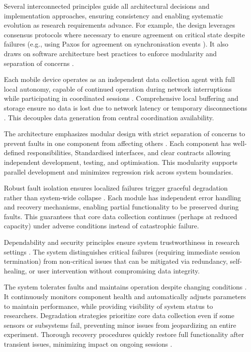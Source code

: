 \documentclass[11pt,a4paper]{report}
\begin{document}
Several interconnected principles guide all architectural decisions and implementation approaches, ensuring consistency and enabling systematic evolution as research requirements advance. For example, the design leverages consensus protocols where necessary to ensure agreement on critical state despite failures (e.g., using Paxos for agreement on synchronisation events \cite{Lamport2001}). It also draws on software architecture best practices to enforce modularity and separation of concerns \cite{Bass2012}.

Each mobile device operates as an independent data collection agent with full local autonomy, capable of continued operation during network interruptions while participating in coordinated sessions \cite{Fischer1985}. Comprehensive local buffering and storage ensure no data is lost due to network latency or temporary disconnections \cite{Chandra1996}. This decouples data generation from central coordination availability.

The architecture emphasizes modular design with strict separation of concerns to prevent faults in one component from affecting others \cite{Parnas1972}. Each component has well-defined responsibilities, Standardised interfaces, and clear contracts allowing independent development, testing, and optimisation. This modularity supports parallel development and minimizes regression risk across system boundaries.

Robust fault isolation ensures localized failures trigger graceful degradation rather than system-wide collapse \cite{Garlan1993}. Each module has independent error handling and recovery mechanisms, enabling partial functionality to be preserved during faults. This guarantees that core data collection continues (perhaps at reduced capacity) under adverse conditions instead of catastrophic failure.

Dependability and security principles ensure system trustworthiness in research settings \cite{Avizienis2004}. The system distinguishes critical failures (requiring immediate session termination) from non-critical issues that can be mitigated via redundancy, self-healing, or user intervention without compromising data integrity. 

The system tolerates faults and maintains operation despite changing conditions \cite{Jalote1994}. It continuously monitors component health and automatically adjusts parameters to maintain performance, while providing visibility of system status to researchers. Degradation strategies prioritize core data collection even if some sensors or subsystems fail, preventing minor issues from jeopardizing an entire experiment. Thorough recovery procedures quickly restore full functionality after transient issues, minimizing impact on ongoing sessions \cite{Lee1990}.
\end{document}
